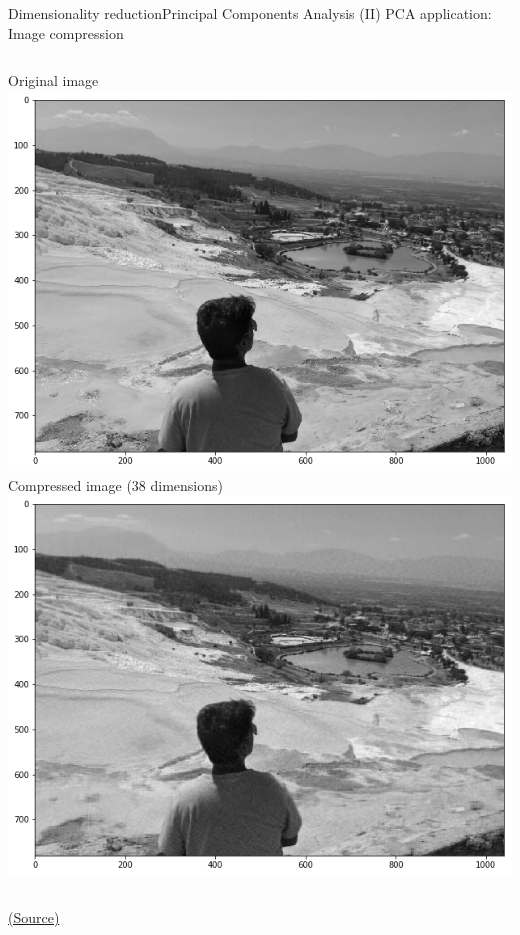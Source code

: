 \documentclass[10pt,compress]{beamer} %
\begin{document}
\begin{frame}{Dimensionality reduction}{Principal Components Analysis (II)}
	PCA application: Image compression

    \bigskip

    \begin{columns}
            Original image
			\includegraphics[width=\linewidth]{figs/pcaoriginal.png}\\
            Compressed image (38 dimensions)
			\includegraphics[width=\linewidth]{figs/pca150comps.png}
    \end{columns}

   	\centering \tiny{\href{https://www.kaggle.com/code/mirzarahim/introduction-to-pca-image-compression-example}{(Source)}}
\end{frame}
\end{document}
